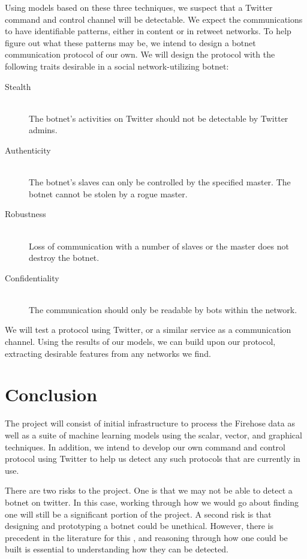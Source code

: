 \documentclass[paper=a4, fontsize=11pt]{scrartcl} %
\numberwithin{equation}{section} %
\numberwithin{figure}{section} %
\numberwithin{table}{section} %
\begin{document}
Using models based on these three techniques, we suspect that a Twitter command and control channel will be detectable. We expect the communications to have identifiable patterns, either in content or in retweet networks. To help figure out what these patterns may be, we intend to design a botnet communication protocol of our own. We will design the protocol with the following traits desirable in a social network-utilizing botnet:

\begin{description}

\item[Stealth] \hfill\\
	The botnet's activities on Twitter should not be detectable by Twitter admins.

\item[Authenticity] \hfill\\
	The botnet's slaves can only be controlled by the specified master.
	The botnet cannot be stolen by a rogue master.

\item[Robustness] \hfill \\
	Loss of communication with a number of slaves or the master does not destroy the botnet.

\item[Confidentiality] \hfill \\
	The communication should only be readable by bots within the network.

\end{description}

We will test a protocol using Twitter, or a similar service as a communication channel.
Using the results of our models, we can build upon our protocol, extracting desirable features from any networks we find. 


\section{Conclusion}

The project will consist of initial infrastructure to process the Firehose data as well as a suite of machine learning models using the scalar, vector, and graphical techniques. In addition, we intend to develop our own command and control protocol using Twitter to help us detect any such protocols that are currently in use.

There are two risks to the project. One is that we may not be able to detect a botnet on twitter. In this case, working through how we would
go about finding one will still be a significant portion of the project. A second risk is that designing and prototyping a botnet could be
unethical. However, there is precedent in the literature for this \cite{stegobot,skype,socialnetworking},
and reasoning through how one could be built is essential to understanding how they can be detected.
\end{document}

